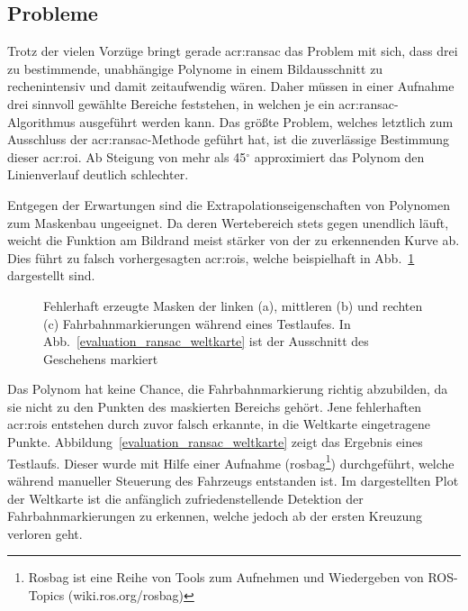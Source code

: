 \subsection{Probleme}
\label{ssec:evaluation:ransac:probleme}
Trotz der vielen Vorzüge bringt gerade \gls{acr:ransac} das Problem mit sich, dass drei zu bestimmende, unabhängige Polynome in einem Bildausschnitt zu rechenintensiv und damit zeitaufwendig wären. Daher müssen in einer Aufnahme drei sinnvoll gewählte Bereiche feststehen, in welchen je ein \gls{acr:ransac}-Algorithmus ausgeführt werden kann. 
Das größte Problem, welches letztlich zum Ausschluss der \gls{acr:ransac}-Methode geführt hat, ist die zuverlässige Bestimmung dieser \gls{acr:roi}. Ab Steigung von mehr als 45\(^\circ\) approximiert das Polynom den Linienverlauf deutlich schlechter. 

Entgegen der Erwartungen sind die Extrapolationseigenschaften von Polynomen zum Maskenbau ungeeignet. Da deren Wertebereich stets gegen unendlich läuft, weicht die Funktion am Bildrand meist stärker von der zu erkennenden Kurve ab. Dies führt zu falsch vorhergesagten \glspl{acr:roi}, welche beispielhaft in Abb.~\ref{fig:evaluation_ransac_ransac} dargestellt sind.

\begin{figure}[htbp]
	\centering
	\hfill
	\hfill
	\caption{Fehlerhaft erzeugte Masken der linken (a), mittleren (b) und rechten (c) Fahrbahnmarkierungen während eines Testlaufes. In Abb.~\ref{evaluation_ransac_weltkarte} ist der Ausschnitt des Geschehens markiert}
	\label{fig:evaluation_ransac_ransac}
\end{figure} 

Das Polynom hat keine Chance, die Fahrbahnmarkierung richtig abzubilden, da sie nicht zu den Punkten des maskierten Bereichs gehört. Jene fehlerhaften \glspl{acr:roi} entstehen durch zuvor falsch erkannte, in die Weltkarte eingetragene Punkte. Abbildung~\ref{evaluation_ransac_weltkarte} zeigt das Ergebnis eines Testlaufs. Dieser wurde mit Hilfe einer Aufnahme (rosbag\footnote{Rosbag ist eine Reihe von Tools zum Aufnehmen und Wiedergeben von ROS-Topics (wiki.ros.org/rosbag)}) durchgeführt, welche während manueller Steuerung des Fahrzeugs entstanden ist. Im dargestellten Plot der Weltkarte ist die anfänglich zufriedenstellende Detektion der Fahrbahnmarkierungen zu erkennen, welche jedoch ab der ersten Kreuzung verloren geht.


